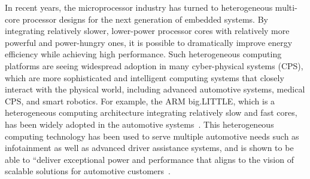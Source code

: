 In recent years, the microprocessor industry has turned to heterogeneous multi-core processor designs for the next generation of embedded systems. By integrating relatively slower, lower-power processor cores with relatively more powerful and power-hungry ones, it is possible to dramatically improve energy efficiency while achieving high performance. %
  Such heterogeneous computing platforms are seeing widespread adoption in many cyber-physical systems (CPS), which are more sophisticated and intelligent computing systems that closely interact with the physical world, including advanced automotive systems, medical CPS, and smart robotics. %
 For example, the ARM big.LITTLE, which is a heterogeneous computing architecture integrating relatively slow and fast cores, has been widely adopted in the automotive systems~\cite{?}. This heterogeneous computing technology has been used to serve multiple automotive needs such as infotainment as well as advanced driver assistance systems, and is shown to be able to ``deliver exceptional power and performance that aligns to the vision of scalable solutions for automotive customers~\cite{?}. 
 

